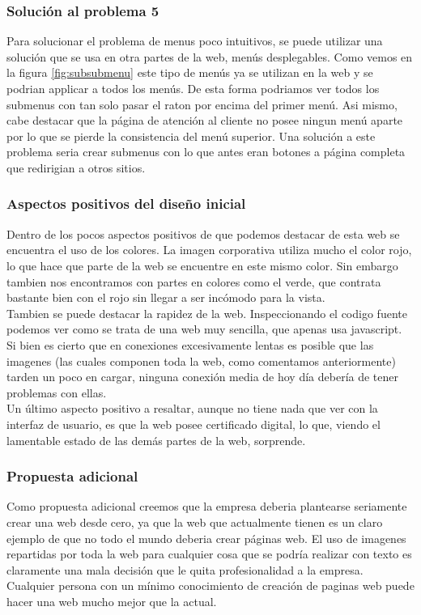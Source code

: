 \documentclass[a4paper,11pt]{article}
\begin{document}
\subsubsection{Solución al problema 5}
Para solucionar el problema de menus poco intuitivos, se puede utilizar una solución que se usa en otra partes de la web, menús desplegables.
Como vemos en la figura \ref{fig:subsubmenu} este tipo de menús ya se utilizan en la web y se podrian applicar a todos los menús. De esta forma podriamos ver todos los submenus con tan solo pasar el raton por encima del primer menú. Asi mismo, cabe destacar que la página de atención al cliente no posee ningun menú aparte por lo que se pierde la consistencia del menú superior. Una solución a este problema seria crear submenus con lo que antes eran botones a página completa que redirigian a otros sitios.


\subsubsection{Aspectos positivos del diseño inicial}
Dentro de los pocos aspectos positivos de que podemos destacar de esta web se encuentra el uso de los colores. La imagen corporativa utiliza mucho el color rojo, lo que hace que parte de la web se encuentre en este mismo color. Sin embargo tambien nos encontramos con partes en colores como el verde, que contrata bastante bien con el rojo sin llegar a ser incómodo para la vista.\\
Tambien se puede destacar la rapidez de la web. Inspeccionando el codigo fuente podemos ver como se trata de una web muy sencilla, que apenas usa javascript. Si bien es cierto que en conexiones excesivamente lentas es posible que las imagenes (las cuales componen toda la web, como comentamos anteriormente) tarden un poco en cargar, ninguna conexión media de hoy día debería de tener problemas con ellas.\\
Un último aspecto positivo a resaltar, aunque no tiene nada que ver con la interfaz de usuario, es que la web posee certificado digital, lo que, viendo el lamentable estado de las demás partes de la web, sorprende.


\subsubsection{Propuesta adicional}
Como propuesta adicional creemos que la empresa deberia plantearse seriamente crear una web desde cero, ya que la web que actualmente tienen es un claro ejemplo de que no todo el mundo deberia crear páginas web. El uso de imagenes repartidas por toda la web para cualquier cosa que se podría realizar con texto es claramente una mala decisión que le quita profesionalidad a la empresa.\\
Cualquier persona con un mínimo conocimiento de creación de paginas web puede hacer una web mucho mejor que la actual.
\end{document}
